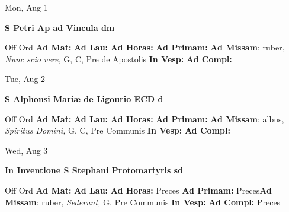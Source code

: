 \documentclass[10pt]{memoir}
\begin{document}
\begin{center}
\begin{minipage}{3.5in}
\vspace{2em}
\begin{center}Mon, Aug 1
\end{center}
\textbf{ \large S Petri Ap ad Vincula
\textnormal{\normalsize dm}}

\begin{justify}Off Ord
\textbf{Ad Mat: }
\textbf{Ad Lau: }
\textbf{Ad Horas: }
\textbf{Ad Primam: }\textbf{Ad Missam}: ruber, \textit{Nunc scio vere,} G, C, Pre de Apostolis
\textbf{In Vesp: }
\textbf{Ad Compl: }
\end{justify}
\end{minipage}
\end{center}

\begin{center}
\begin{minipage}{3.5in}
\vspace{2em}
\begin{center}Tue, Aug 2
\end{center}
\textbf{ \large S Alphonsi Mariæ de Ligourio ECD
\textnormal{\normalsize d}}

\begin{justify}Off Ord
\textbf{Ad Mat: }
\textbf{Ad Lau: }
\textbf{Ad Horas: }
\textbf{Ad Primam: }\textbf{Ad Missam}: albus, \textit{Spiritus Domini,} G, C, Pre Communis
\textbf{In Vesp: }
\textbf{Ad Compl: }
\end{justify}
\end{minipage}
\end{center}

\begin{center}
\begin{minipage}{3.5in}
\vspace{2em}
\begin{center}Wed, Aug 3
\end{center}
\textbf{ \large In Inventione S Stephani Protomartyris
\textnormal{\normalsize sd}}

\begin{justify}Off Ord
\textbf{Ad Mat: }
\textbf{Ad Lau: }
\textbf{Ad Horas: }Preces
\textbf{Ad Primam: }Preces\textbf{Ad Missam}: ruber, \textit{Sederunt,} G, Pre Communis
\textbf{In Vesp: }
\textbf{Ad Compl: }Preces
\end{justify}
\end{minipage}
\end{center}
\end{document}
